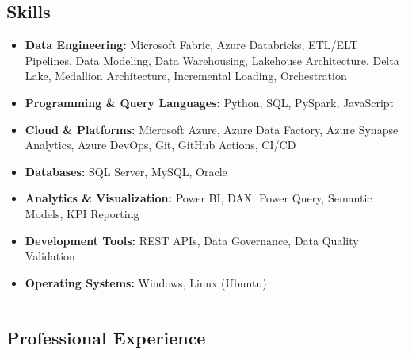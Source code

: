 \documentclass[11pt,letterpaper]{article}
\begin{document}

\subsection*{\Large Skills}

\begin{itemize}[leftmargin=1em,noitemsep]

\item \textbf{Data Engineering:} Microsoft Fabric, Azure Databricks, ETL/ELT Pipelines, Data Modeling, Data Warehousing, Lakehouse Architecture, Delta Lake, Medallion Architecture, Incremental Loading, Orchestration

\item \textbf{Programming \& Query Languages:} Python, SQL, PySpark, JavaScript

\item \textbf{Cloud \& Platforms:} Microsoft Azure, Azure Data Factory, Azure Synapse Analytics, Azure DevOps, Git, GitHub Actions, CI/CD

\item \textbf{Databases:} SQL Server, MySQL, Oracle

\item \textbf{Analytics \& Visualization:} Power BI, DAX, Power Query, Semantic Models, KPI Reporting

\item \textbf{Development Tools:} REST APIs, Data Governance, Data Quality Validation

\item \textbf{Operating Systems:} Windows, Linux (Ubuntu)

\end{itemize}

\hrule
\vspace{-0.8em}


\subsection*{\Large Professional Experience}
\end{document}
